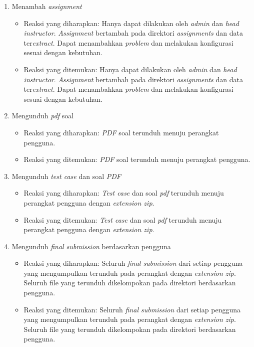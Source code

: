 \begin{enumerate}
\begin{itemize}
	 \end{itemize}
	 \item Menambah \textit{assignment}
	 \begin{itemize}
	 	\item Reaksi yang diharapkan: Hanya dapat dilakukan oleh \textit{admin} dan \textit{head instructor}. \textit{Assignment} bertambah pada direktori \textit{assignments} dan data ter\textit{extract}. Dapat menambahkan \textit{problem} dan melakukan konfigurasi sesuai dengan kebutuhan.
	 	\item Reaksi yang ditemukan: Hanya dapat dilakukan oleh \textit{admin} dan \textit{head instructor}. \textit{Assignment} bertambah pada direktori \textit{assignments} dan data ter\textit{extract}. Dapat menambahkan \textit{problem} dan melakukan konfigurasi sesuai dengan kebutuhan.
	 \end{itemize}
	 \item Mengunduh \textit{pdf} soal
	 \begin{itemize}
	 	\item Reaksi yang diharapkan: \textit{PDF} soal terunduh menuju perangkat pengguna.
	 	\item Reaksi yang ditemukan: \textit{PDF} soal terunduh menuju perangkat pengguna.
	 \end{itemize}
	 \item Mengunduh \textit{test case} dan soal \textit{PDF}
	 \begin{itemize}
	 	\item Reaksi yang diharapkan: \textit{Test case} dan soal \textit{pdf} terunduh menuju perangkat pengguna dengan \textit{extension zip}.
	 	\item Reaksi yang ditemukan: \textit{Test case} dan soal \textit{pdf} terunduh menuju perangkat pengguna dengan \textit{extension zip}.
	 \end{itemize}
	 \item Mengunduh \textit{final submission} berdasarkan pengguna
	 \begin{itemize}
	 	\item Reaksi yang diharapkan: Seluruh \textit{final submission} dari setiap pengguna yang mengumpulkan terunduh pada perangkat dengan \textit{extension zip}. Seluruh file yang terunduh dikelompokan pada direktori berdasarkan pengguna.
	 	\item Reaksi yang ditemukan: Seluruh \textit{final submission} dari setiap pengguna yang mengumpulkan terunduh pada perangkat dengan \textit{extension zip}. Seluruh file yang terunduh dikelompokan pada direktori berdasarkan pengguna.

\end{itemize}
\end{enumerate}
